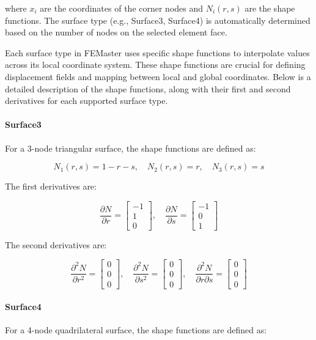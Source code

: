 where $x_i$ are the coordinates of the corner nodes and $N_i(r, s)$ are the shape functions.
The surface type (e.g., Surface3, Surface4) is automatically determined based on the number of nodes on the selected element face.

Each surface type in FEMaster uses specific shape functions to interpolate values across its local coordinate system.
These shape functions are crucial for defining displacement fields and mapping between local and global coordinates.
Below is a detailed description of the shape functions, along with their first and second derivatives for each supported surface type.

\paragraph{Surface3}
For a 3-node triangular surface, the shape functions are defined as:

\[
N_1(r, s) = 1 - r - s, \quad N_2(r, s) = r, \quad N_3(r, s) = s
\]

The first derivatives are:

\[
\frac{\partial N}{\partial r} =
\begin{bmatrix}
-1 \\
1 \\
0
\end{bmatrix}, \quad
\frac{\partial N}{\partial s} =
\begin{bmatrix}
-1 \\
0 \\
1
\end{bmatrix}
\]

The second derivatives are:

\[
\frac{\partial^2 N}{\partial r^2} =
\begin{bmatrix}
0 \\
0 \\
0
\end{bmatrix}, \quad
\frac{\partial^2 N}{\partial s^2} =
\begin{bmatrix}
0 \\
0 \\
0
\end{bmatrix}, \quad
\frac{\partial^2 N}{\partial r \partial s} =
\begin{bmatrix}
0 \\
0 \\
0
\end{bmatrix}
\]

\paragraph{Surface4} For a 4-node quadrilateral surface, the shape functions are defined as:

